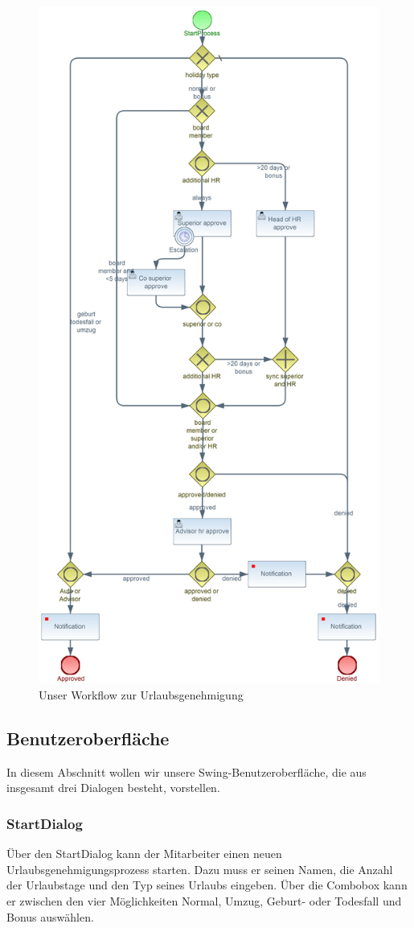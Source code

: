 \begin{figure}[H]
\centering
\includegraphics[width=0.75\linewidth]{Bilder/Urlaubsantrag}
\caption{Unser Workflow zur Urlaubsgenehmigung}
\label{fig:Urlaubsantrag}
\end{figure}


\subsection{Benutzeroberfläche}
In diesem Abschnitt wollen wir unsere Swing-Benutzeroberfläche, die aus insgesamt drei Dialogen besteht, vorstellen.

\subsubsection{StartDialog}
Über den StartDialog kann der Mitarbeiter einen neuen Urlaubsgenehmigungsprozess starten. Dazu muss er seinen Namen, die Anzahl der Urlaubstage und den Typ seines Urlaubs eingeben. Über die Combobox kann er zwischen den vier Möglichkeiten Normal, Umzug, Geburt- oder Todesfall und Bonus auswählen.

